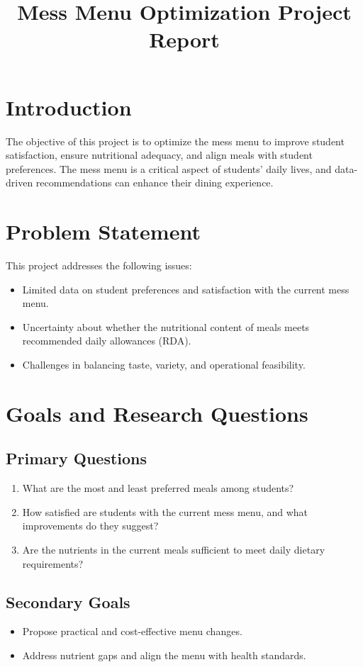 \documentclass[12pt,a4paper]{article}
\title{\textbf{Mess Menu Optimization Project Report}}
\date{}
\begin{document}
\vspace{-0.8in}

\section*{Introduction}
The objective of this project is to optimize the mess menu to improve student satisfaction, ensure nutritional adequacy, and align meals with student preferences. The mess menu is a critical aspect of students' daily lives, and data-driven recommendations can enhance their dining experience.

\section*{Problem Statement}
This project addresses the following issues:
\begin{itemize}
    \item Limited data on student preferences and satisfaction with the current mess menu.
    \item Uncertainty about whether the nutritional content of meals meets recommended daily allowances (RDA).
    \item Challenges in balancing taste, variety, and operational feasibility.
\end{itemize}

\section*{Goals and Research Questions}
\subsection*{Primary Questions}
\begin{enumerate}
    \item What are the most and least preferred meals among students?
    \item How satisfied are students with the current mess menu, and what improvements do they suggest?
    \item Are the nutrients in the current meals sufficient to meet daily dietary requirements?
\end{enumerate}

\subsection*{Secondary Goals}
\begin{itemize}
    \item Propose practical and cost-effective menu changes.
    \item Address nutrient gaps and align the menu with health standards.
\end{itemize}
\end{document}
